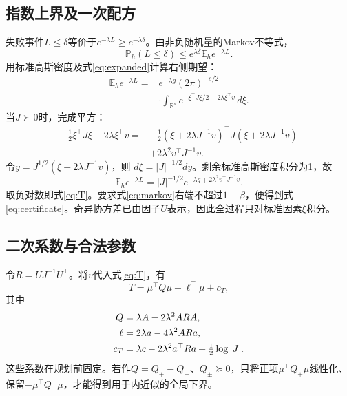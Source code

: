 \documentclass[journal,10pt]{IEEEtran}
\newcommand{\E}{\mathbb E}
\newcommand{\Prob}{\mathbb P}
\newcommand{\R}{\mathbb R}
\begin{document}
\subsection{指数上界及一次配方}
失败事件$L\le\delta$等价于$e^{-\lambda L}\ge e^{-\lambda\delta}$。由非负随机量的Markov不等式，
\begin{equation}
\Prob_h(L\le\delta)
\le e^{\lambda\delta}\E_h e^{-\lambda L}. \label{eq:markov}
\end{equation}
用标准高斯密度及式\eqref{eq:expanded}计算右侧期望：
\begin{equation}
\begin{split}
\E_h e^{-\lambda L}
={}&e^{-\lambda g}(2\pi)^{-s/2}\\
&\cdot\int_{\R^s}
e^{-\xi^\top J\xi/2-2\lambda\xi^\top v}\,d\xi.
\end{split} \label{eq:integral}
\end{equation}
当$J\succ0$时，完成平方：
\begin{equation}
\begin{split}
-\tfrac12\xi^\top J\xi-2\lambda\xi^\top v
={}&-\tfrac12(\xi+2\lambda J^{-1}v)^\top
J(\xi+2\lambda J^{-1}v)\\
&+2\lambda^2v^\top J^{-1}v.
\end{split} \label{eq:square}
\end{equation}
令$y=J^{1/2}(\xi+2\lambda J^{-1}v)$，则
$d\xi=|J|^{-1/2}dy$。剩余标准高斯密度积分为1，故
\begin{equation}
\E_h e^{-\lambda L}
=|J|^{-1/2}e^{-\lambda g+2\lambda^2v^\top J^{-1}v}.
\label{eq:moment}
\end{equation}
取负对数即式\eqref{eq:T}。要求式\eqref{eq:markov}右端不超过$1-\beta$，便得到式\eqref{eq:certificate}。奇异协方差已由因子$U$表示，因此全过程只对标准因素$\xi$积分。

\subsection{二次系数与合法参数}
令$R=UJ^{-1}U^\top$。将$v$代入式\eqref{eq:T}，有
\begin{equation}
T=\mu^\top Q\mu+\ell^\top\mu+c_T, \label{eq:explicit}
\end{equation}
其中
\begin{align}
Q&=\lambda A-2\lambda^2ARA, \notag\\
\ell&=2\lambda a-4\lambda^2ARa, \notag\\
c_T&=\lambda c-2\lambda^2a^\top Ra+\tfrac12\log|J|.
\label{eq:expanded_coefficients}
\end{align}
这些系数在规划前固定。若作$Q=Q_+-Q_-$、$Q_\pm\succeq0$，只将正项$\mu^\top Q_+\mu$线性化、保留$-\mu^\top Q_-\mu$，才能得到用于内近似的全局下界。
\end{document}
